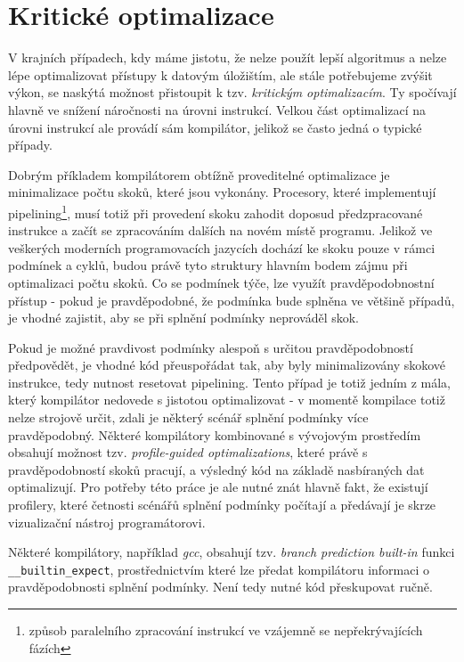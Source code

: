 \documentclass[czech,BP]{thesiskiv}
\begin{document}
\section{Kritické optimalizace}

V krajních případech, kdy máme jistotu, že nelze použít lepší algoritmus a nelze lépe optimalizovat přístupy k datovým úložištím, ale stále potřebujeme zvýšit výkon, se naskýtá možnost přistoupit k tzv. \emph{kritickým optimalizacím}. Ty spočívají hlavně ve snížení náročnosti na úrovni instrukcí. Velkou část optimalizací na úrovni instrukcí ale provádí sám kompilátor, jelikož se často jedná o typické případy.

Dobrým příkladem kompilátorem obtížně proveditelné optimalizace je minimalizace počtu skoků, které jsou vykonány. Procesory, které implementují pipelining\footnote{způsob paralelního zpracování instrukcí ve vzájemně se nepřekrývajících fázích}, musí totiž při provedení skoku zahodit doposud předzpracované instrukce a začít se zpracováním dalších na novém místě programu. Jelikož ve veškerých moderních programovacích jazycích dochází ke skoku pouze v rámci podmínek a cyklů, budou právě tyto struktury hlavním bodem zájmu při optimalizaci počtu skoků. Co se podmínek týče, lze využít pravděpodobnostní přístup - pokud je pravděpodobné, že podmínka bude splněna ve většině případů, je vhodné zajistit, aby se při splnění podmínky neprováděl skok.

Pokud je možné pravdivost podmínky alespoň s určitou pravděpodobností předpovědět, je vhodné kód přeuspořádat tak, aby byly minimalizovány skokové instrukce, tedy nutnost resetovat pipelining. Tento případ je totiž jedním z mála, který kompilátor nedovede s jistotou optimalizovat - v momentě kompilace totiž nelze strojově určit, zdali je některý scénář splnění podmínky více pravděpodobný. Některé kompilátory kombinované s vývojovým prostředím obsahují možnost tzv. \emph{profile-guided optimalizations}, které právě s pravděpodobností skoků pracují, a výsledný kód na základě nasbíraných dat optimalizují. Pro potřeby této práce je ale nutné znát hlavně fakt, že existují profilery, které četnosti scénářů splnění podmínky počítají a předávají je skrze vizualizační nástroj programátorovi.

Některé kompilátory, například \emph{gcc}, obsahují tzv. \emph{branch prediction built-in} funkci \texttt{\_\_builtin\_expect}, prostřednictvím které lze předat kompilátoru informaci o pravděpodobnosti splnění podmínky. Není tedy nutné kód přeskupovat ručně.
\end{document}
